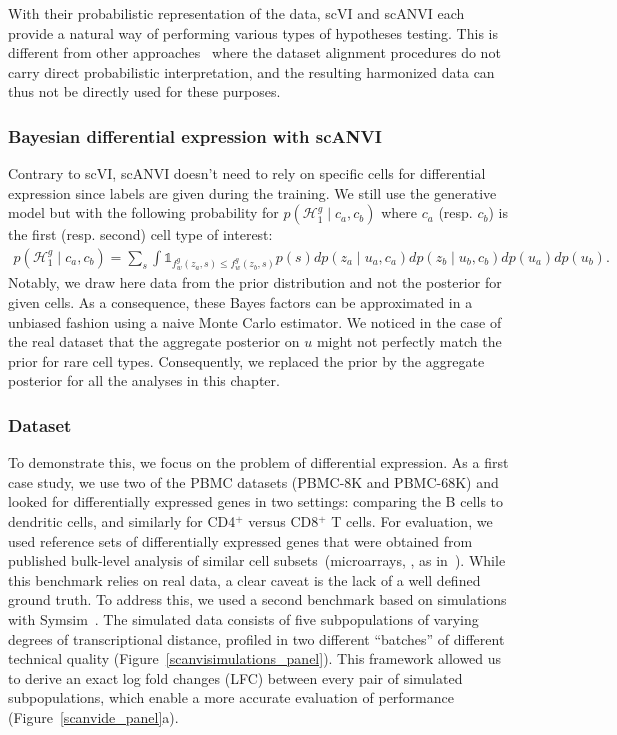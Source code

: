 With their probabilistic representation of the data, scVI and scANVI each provide a natural way of performing various types of hypotheses testing. This is different from other approaches~\cite{MNN,seurat,LIGER,scanorama,SEURAT3} where the dataset alignment procedures do not carry direct probabilistic interpretation, and the resulting harmonized data can thus not be directly used for these purposes.

\subsubsection{Bayesian differential expression with scANVI}
Contrary to scVI, scANVI doesn't need to rely on specific cells for differential expression since labels are given during the training. We still use the generative model but with the following probability for $p(\mathcal{H}_1^g \mid c_a, c_b)$ where $c_a$ (resp. $c_b$) is the first (resp. second) cell type of interest:
\begin{align}
p(\mathcal{H}_1^g \mid c_a, c_b) = \sum_s\int \mathds{1}_{f_w^g(z_a, s) \leq f_w^g(z_b, s) }p(s)dp(z_a \mid u_a, c_a)dp(z_b \mid u_b, c_b)dp(u_a)dp(u_b).
\end{align}
Notably, we draw here data from the prior distribution and not the posterior for given cells. As a consequence, these Bayes factors can be approximated in a unbiased fashion using a naive Monte Carlo estimator. We noticed in the case of the real dataset that the aggregate posterior on $u$ might not perfectly match the prior for rare cell types. Consequently, we replaced the prior by the aggregate posterior for all the analyses in this chapter. 

\subsubsection{Dataset}


To demonstrate this, we focus on the problem of differential expression. As a first case study, we use two of the PBMC datasets (PBMC-8K and PBMC-68K) and looked for differentially expressed genes in two settings: comparing the B cells to dendritic cells, and similarly for CD4$^+$ versus CD8$^+$ T cells. For evaluation, we used reference sets of differentially expressed genes that were obtained from published bulk-level analysis of similar cell subsets~(microarrays, \cite{Nakaya2011, Gorgun2005}, as in~\cite{scvi}). While this benchmark relies on real data, a clear caveat is the lack of a well defined ground truth. To address this, we used a second benchmark based on simulations with Symsim~\cite{symsim}. The simulated data consists of five subpopulations of varying degrees of transcriptional distance, profiled in two different “batches” of different technical quality (Figure~\ref{scanvisimulations_panel}). This framework allowed us to derive an exact log fold changes (LFC) between every pair of simulated subpopulations, which enable a more accurate evaluation of performance (Figure~\ref{scanvide_panel}a). 


